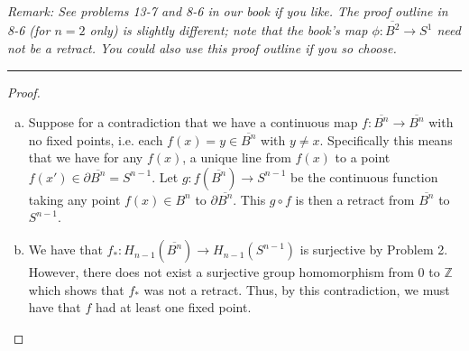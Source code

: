 \documentclass[leqno]{article}
\theoremstyle{nonumberplain}
\newtheorem{proof}{Proof}
\newcommand{\Z}{\ensuremath{\mathbb{Z}}}
\begin{document}
\emph{Remark: See problems 13-7 and 8-6 in our book if you like. The proof outline in 8-6 (for $n=2$ only) is slightly different; note that the book's map $\phi\colon \overline{B^2}\to S^{1}$ need not be a retract. You could also use this proof outline if you so choose.}

\noindent\rule[0.5ex]{\linewidth}{1pt}

\begin{proof}
\begin{enumerate}[(a)]
\item Suppose for a contradiction that we have a continuous map $f\colon \overline{B^n} \to \overline{B^{n}}$ with no fixed points, i.e. each $f(x)=y\in \overline{B^n}$ with $y\neq x$. Specifically this means that we have for any $f(x)$, a unique line from $f(x)$ to a point $f(x')\in \partial \overline{B^n}=S^{n-1}$. Let $g\colon f(\overline{B^n})\to S^{n-1}$ be the continuous function taking any point $f(x)\in B^n$ to $\partial \overline{B^n}$. This $g\circ f$ is then a retract from $\overline{B^n}$ to $S^{n-1}$.

\item We have that $f_* \colon H_{n-1}(\overline{B^n}) \to H_{n-1}(S^{n-1})$ is surjective by Problem 2. However, there does not exist a surjective group homomorphism from $0$ to $\Z$ which shows that $f_*$ was not a retract. Thus, by this contradiction, we must have that $f$ had at least one fixed point. 
\end{enumerate}
\end{proof}

\pagebreak
\end{document}
